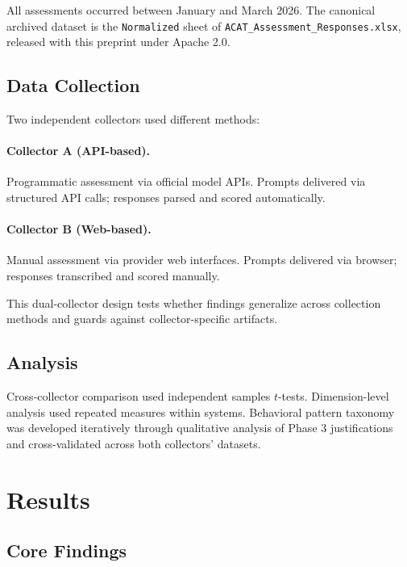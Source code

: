\documentclass[11pt,a4paper]{article}
\begin{document}
All assessments occurred between January and March 2026. The canonical archived dataset is the \texttt{Normalized} sheet of \texttt{ACAT\_Assessment\_Responses.xlsx}, released with this preprint under Apache 2.0.

\subsection{Data Collection}

Two independent collectors used different methods:

\paragraph{Collector A (API-based).} Programmatic assessment via official model APIs. Prompts delivered via structured API calls; responses parsed and scored automatically.

\paragraph{Collector B (Web-based).} Manual assessment via provider web interfaces. Prompts delivered via browser; responses transcribed and scored manually.

This dual-collector design tests whether findings generalize across collection methods and guards against collector-specific artifacts.

\subsection{Analysis}

Cross-collector comparison used independent samples $t$-tests. Dimension-level analysis used repeated measures within systems. Behavioral pattern taxonomy was developed iteratively through qualitative analysis of Phase 3 justifications and cross-validated across both collectors' datasets.

\section{Results}

\subsection{Core Findings}
\end{document}
